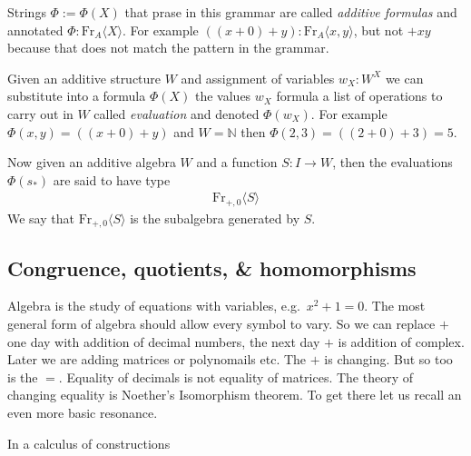 Strings $\Phi:=\Phi(X)$ that prase in this grammar are called \emph{additive formulas} 
and annotated $\Phi:\text{Fr}_{A}\langle X\rangle$.  For example 
$((x+0)+y):\text{Fr}_A\langle x,y\rangle$, 
but not $+xy$ because that does not match the pattern in the grammar.

Given an additive structure $W$ and assignment of variables $w_X:W^X$
we can substitute into a formula $\Phi(X)$ the values $w_X$ formula 
a list of operations to carry out in $W$ called \emph{evaluation} and denoted 
$\Phi(w_X)$.  For example $\Phi(x,y)=((x+0)+y)$ and $W=\mathbb{N}$ then 
$\Phi(2,3)=((2+0)+3)=5$.  

Now given an additive algebra $W$ and a function $S:I\to W$, then 
the evaluations $\Phi(s_*)$ are said to have type 
\begin{align*}
    \text{Fr}_{+,0}\langle S\rangle 
\end{align*}
We say that $\text{Fr}_{+,0}\langle S\rangle$ is the subalgebra generated 
by $S$.

\subsection{Congruence, quotients, \& homomorphisms}
Algebra is the study of equations with variables, e.g.\ $x^2+1=0$.  
The most general form of algebra should allow every symbol to vary.  
So we can replace $+$ one day with addition of decimal numbers, 
the next day $+$ is addition of complex.  Later we are adding matrices
or polynomails etc.  The $+$ is changing.  But so too is the $=$. 
Equality of decimals is not equality of matrices.  The theory of 
changing equality is Noether's Isomorphism theorem.  To get there let 
us recall an even more basic resonance.

\begin{theorem}
    In a calculus of constructions
    \begin{center}
    \end{center}
\end{theorem}

